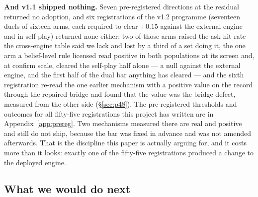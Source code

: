 \documentclass[11pt,letterpaper]{article}
\begin{document}
\textbf{And v1.1 shipped nothing.} Seven pre-registered directions at the
residual returned no adoption, and six registrations of the v1.2 programme
(seventeen duels of sixteen arms, each required to clear $+0.15$ against
the external engine and in self-play) returned none either; two of those arms raised the
ask hit rate the cross-engine table said we lack and lost by a third of a set
doing it, the one arm a belief-level rule licensed read positive in both
populations at its screen and, at confirm scale, cleared the self-play half
alone --- a null against the external engine, and the first half of the dual bar anything
has cleared --- and the sixth registration re-read the one earlier mechanism
with a positive value on the record through the repaired bridge and found
that the value was the bridge defect, measured from the other side
(\S\ref{sec:p48}). The pre-registered thresholds and outcomes for all
fifty-five
registrations this project has written are in Appendix~\ref{app:prereg}. Two
mechanisms measured there are real and positive and still do not ship,
because the bar was fixed in advance and was not amended afterwards. That is
the discipline this paper is actually arguing for, and it costs more than it
looks: exactly one of the fifty-five registrations produced a change to the
deployed engine.

\subsection{What we would do next}
\label{sec:next}
\end{document}
